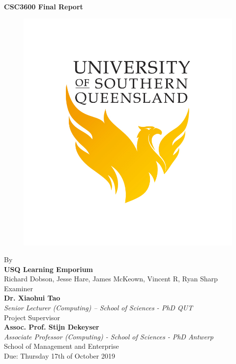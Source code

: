 \documentclass[11pt]{article}
\begin{document}

    \begin{titlepage}
        \centering
        \vspace {1cm}
        \huge{\textbf{CSC3600 Final Report}} \\ [0.1cm]
        \begin{figure}[ht!]
            \centering
            \def\svgwidth{0.5\columnwidth}
            \includegraphics[scale={0.20}]{USQ.jpg}
        \end{figure}
        \vspace {0.5cm}
        \Large{By} \\
        \Large{\textbf{USQ Learning Emporium}} \\
        \Large{Richard Dobson, Jesse Hare, James McKeown, Vincent R, Ryan Sharp} \\[0.50cm]
        \Large{Examiner} \\
        \Large{\textbf{Dr. Xiaohui Tao}} \\
        \Large{\textit{Senior Lecturer (Computing) – School of Sciences -
PhD QUT}} \\[0.50cm]
        \Large{Project Supervisor} \\
        \Large{\textbf{Assoc. Prof. Stijn Dekeyser}} \\
        \Large{\textit{Associate Professor (Computing) - School of Sciences - PhD Antwerp}} \\[0.50cm]
        \Large{School of Management and Enterprise} \\[0.50cm]

        \Large{Due: Thursday 17th of October 2019}
    \end{titlepage}
\end{document}
